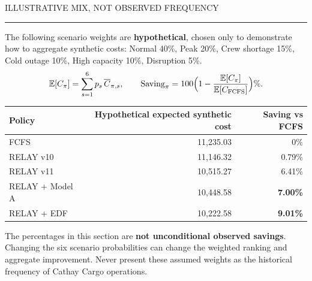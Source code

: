 \documentclass[10pt,a4paper]{article}
\newcommand{\sect}[2]{\vspace{4mm}{\Large\sffamily\bfseries #1}\hfill{\small\sffamily\color{muted}#2}\par\vspace{1mm}\color{sage}\rule{\linewidth}{1.0pt}\color{ink}\vspace{2mm}}
\newcommand{\good}[1]{{\bfseries\color{teal}#1}}
\begin{document}
\sect{11 / Probability-weighted expected cost}{ILLUSTRATIVE MIX, NOT OBSERVED FREQUENCY}
The following scenario weights are \textbf{hypothetical}, chosen only to demonstrate how to aggregate synthetic costs: Normal 40\%, Peak 20\%, Crew shortage 15\%, Cold outage 10\%, High capacity 10\%, Disruption 5\%.
\[
\mathbb E[C_{\pi}]=\sum_{s=1}^{6}p_s\,\overline C_{\pi,s},\qquad
\text{Saving}_{\pi}=100\Bigl(1-\frac{\mathbb E[C_\pi]}{\mathbb E[C_{\rm FCFS}]}\Bigr)\%.
\]
\par\vspace{2mm}
\begin{tabularx}{\linewidth}{@{}Xrr@{}}
\toprule
Policy & Hypothetical expected synthetic cost & Saving vs FCFS\\\midrule
FCFS & 11,235.03 & 0\%\\
RELAY v10 & 11,146.32 & 0.79\%\\
RELAY v11 & 10,515.27 & 6.41\%\\
RELAY + Model A & 10,448.58 & \good{7.00\%}\\
RELAY + EDF & 10,222.58 & \good{9.01\%}\\
\bottomrule
\end{tabularx}
\begin{caution}
The percentages in this section are \textbf{not unconditional observed savings}. Changing the six scenario probabilities can change the weighted ranking and aggregate improvement. Never present these assumed weights as the historical frequency of Cathay Cargo operations.
\end{caution}
\newpage
\end{document}
